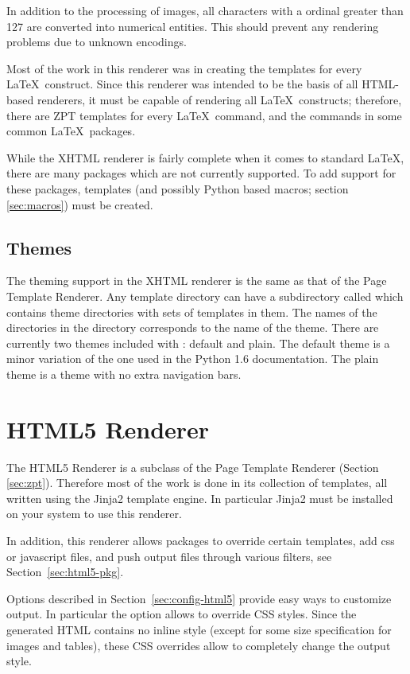 In addition to the processing of images, all characters with a ordinal
greater than 127 are converted into numerical entities.  This should
prevent any rendering problems due to unknown encodings.

Most of the work in this renderer was in creating the templates for
every \LaTeX\ construct.  Since this renderer was intended to be the
basis of all HTML-based renderers, it must be capable of rendering
all \LaTeX\ constructs; therefore, there are ZPT templates for every
\LaTeX\ command, and the commands in some common \LaTeX\ packages.

While the XHTML renderer is fairly complete when it comes to standard
\LaTeX, there are many packages which are not currently supported.
To add support for these packages, templates (and possibly Python
based macros; section \ref{sec:macros}) must be created.


\subsection{Themes}

The theming support in the XHTML renderer is the same as that of the
Page Template Renderer.  Any template directory can have a subdirectory called
 which contains theme directories with sets of templates
in them.  The names of the directories in the  directory
corresponds to the name of the theme.  There are currently two themes
included with \plasTeX: default and plain.  The default theme is a
minor variation of the one used in the Python 1.6 documentation.  The
plain theme is a theme with no extra navigation bars.

\section{HTML5 Renderer}\label{sec:html5}

The HTML5 Renderer is a subclass of the Page Template Renderer (Section
\ref{sec:zpt}). Therefore most of the work is done in its collection of
templates, all written using the Jinja2 template engine. In particular
Jinja2 must be installed on your system to use this renderer.

In addition, this renderer allows packages to override certain templates,
add css or javascript files, and push output files through various
filters, see Section~\ref{sec:html5-pkg}.

Options described in Section~\ref{sec:config-html5} provide easy ways to
customize output. In particular the  option
allows to override CSS styles. Since the generated HTML contains no
inline style (except for some size specification for images and tables),
these CSS overrides allow to completely change the output style.

